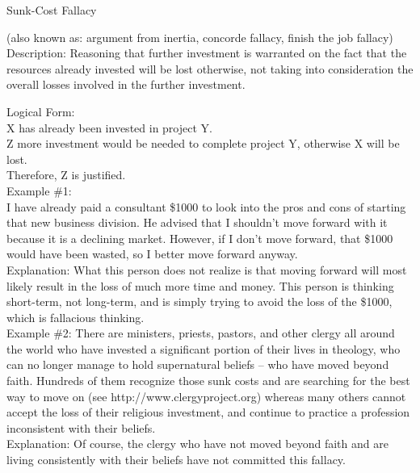 \documentclass[a4paper,12pt,single,pdftex]{scrbook}
\begin{document}
Sunk-Cost Fallacy
    
      (also known as: argument from inertia, concorde fallacy, finish the job fallacy)
    \\

  
    Description: Reasoning that further investment is warranted on the fact that the resources already invested will be lost otherwise, not taking into consideration the overall losses involved in the further investment.

    
      Logical Form:
    \\

    
      X has already been invested in project Y.
    \\

    
      Z more investment would be needed to complete project Y, otherwise X will be lost.
    \\

    
      Therefore, Z is justified.
    \\

    
      Example \#1:
    \\

    
      I have already paid a consultant \$1000 to look into the pros and cons of starting that new business division.  He advised that I shouldn’t move forward with it because it is a declining market.  However, if I don’t move forward, that \$1000 would have been wasted, so I better move forward anyway.
    \\

    
      Explanation: What this person does not realize is that moving forward will most likely result in the loss of much more time and money.  This person is thinking short-term, not long-term, and is simply trying to avoid the loss of the \$1000, which is fallacious thinking.
    \\

    
      Example \#2: There are ministers, priests, pastors, and other clergy all around the world who have invested a significant portion of their lives in theology, who can no longer manage to hold supernatural beliefs -- who have moved beyond faith.  Hundreds of them recognize those sunk costs and are searching for the best way to move on (see http://www.clergyproject.org) whereas many others cannot accept the loss of their religious investment, and continue to practice a profession inconsistent with their beliefs.
    \\

    
      Explanation: Of course, the clergy who have not moved beyond faith and are living consistently with their beliefs have not committed this fallacy.
    \\
\end{document}
